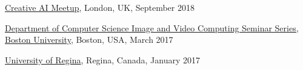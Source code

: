 \documentclass[paper=letter,fontsize=11pt]{scrartcl} %
\newcommand{\TalkEntry}[4]{
		\noindent \href{#4}{#1}, #2, #3 }
\begin{document}
\begin{etaremune}
\item\TalkEntry{Creative AI Meetup}{London, UK}{September 2018}{https://interests.me/org/communitytechevents/story/94296} %

\item\TalkEntry{Department of Computer Science Image and Video Computing Seminar Series, 
Boston University}{Boston, USA}{March 2017}{} %

\item\TalkEntry{%
University of Regina}{Regina, Canada}{January 2017}{} %
\end{etaremune}
\end{document}
